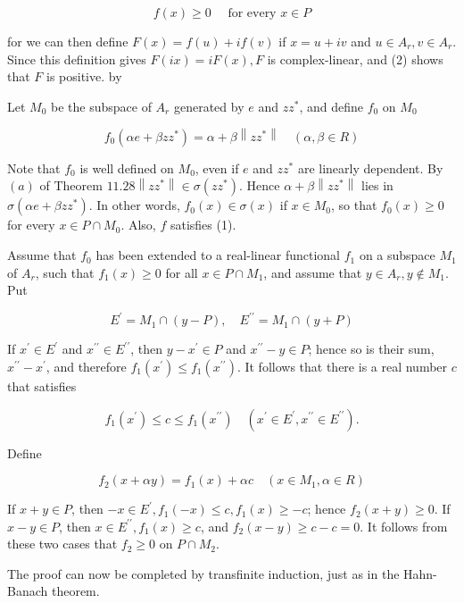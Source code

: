 \documentclass[10pt]{article}
\begin{document}
$$
f(x) \geq 0 \quad \text { for every } x \in P
$$

for we can then define $F(x)=f(u)+i f(v)$ if $x=u+i v$ and $u \in A_{r}, v \in A_{r}$. Since this definition gives $F(i x)=i F(x), F$ is complex-linear, and (2) shows that $F$ is positive. by

Let $M_{0}$ be the subspace of $A_{r}$ generated by $e$ and $z z^{*}$, and define $f_{0}$ on $M_{0}$

$$
f_{0}\left(\alpha e+\beta z z^{*}\right)=\alpha+\beta\left\|z z^{*}\right\| \quad(\alpha, \beta \in R)
$$

Note that $f_{0}$ is well defined on $M_{0}$, even if $e$ and $z z^{*}$ are linearly dependent. By $(a)$ of Theorem $11.28\left\|z z^{*}\right\| \in \sigma\left(z z^{*}\right)$. Hence $\alpha+\beta\left\|z z^{*}\right\|$ lies in $\sigma\left(\alpha e+\beta z z^{*}\right)$. In other words, $f_{0}(x) \in \sigma(x)$ if $x \in M_{0}$, so that $f_{0}(x) \geq 0$ for every $x \in P \cap M_{0}$. Also, $f$ satisfies (1).

Assume that $f_{0}$ has been extended to a real-linear functional $f_{1}$ on a subspace $M_{1}$ of $A_{r}$, such that $f_{1}(x) \geq 0$ for all $x \in P \cap M_{1}$, and assume that $y \in A_{r}, y \notin M_{1}$. Put

$$
E^{\prime}=M_{1} \cap(y-P), \quad E^{\prime \prime}=M_{1} \cap(y+P)
$$

If $x^{\prime} \in E^{\prime}$ and $x^{\prime \prime} \in E^{\prime \prime}$, then $y-x^{\prime} \in P$ and $x^{\prime \prime}-y \in P$; hence so is their sum, $x^{\prime \prime}-x^{\prime}$, and therefore $f_{1}\left(x^{\prime}\right) \leq f_{1}\left(x^{\prime \prime}\right)$. It follows that there is a real number $c$ that satisfies

$$
f_{1}\left(x^{\prime}\right) \leq c \leq f_{1}\left(x^{\prime \prime}\right) \quad\left(x^{\prime} \in E^{\prime}, x^{\prime \prime} \in E^{\prime \prime}\right) .
$$

Define

$$
f_{2}(x+\alpha y)=f_{1}(x)+\alpha c \quad\left(x \in M_{1}, \alpha \in R\right)
$$

If $x+y \in P$, then $-x \in E^{\prime}, f_{1}(-x) \leq c, f_{1}(x) \geq-c$; hence $f_{2}(x+y) \geq 0$. If $x-y \in P$, then $x \in E^{\prime \prime}, f_{1}(x) \geq c$, and $f_{2}(x-y) \geq c-c=0$. It follows from these two cases that $f_{2} \geq 0$ on $P \cap M_{2}$.

The proof can now be completed by transfinite induction, just as in the Hahn-Banach theorem.
\end{document}
